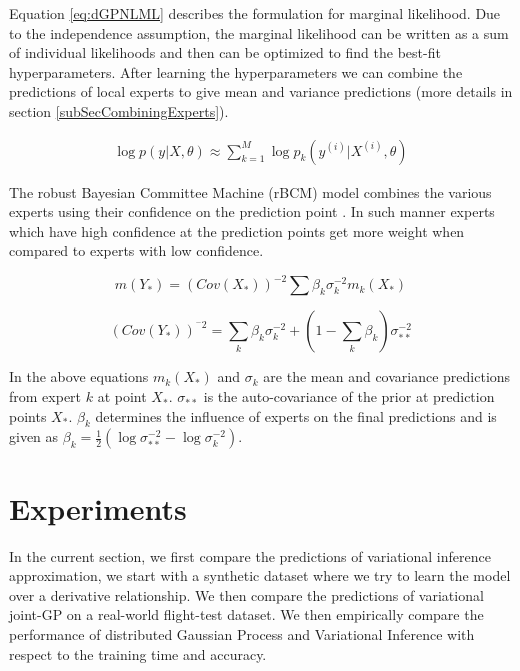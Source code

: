 Equation \ref{eq:dGPNLML} describes the formulation for marginal likelihood. Due to the independence assumption, the marginal likelihood can be written as a sum of individual likelihoods and then can be optimized to find the best-fit hyperparameters. After learning the hyperparameters we can combine the predictions of local experts to give mean and variance predictions (more details in section \ref{subSecCombiningExperts}). 

\begin{align}\label{eq:dGPNLML}
    \log p(y| X, \theta) \approx \sum_{k=1}^{M} \log p_{k}(y^{(i)}| X^{(i)}, \theta)
 \end{align}

The robust Bayesian Committee Machine (rBCM) model combines the various experts using their confidence on the prediction point \cite{deisenroth2015distributed}. In such manner experts which have high confidence at the prediction points get more weight when compared to experts with low confidence. 

\begin{equation}\label{eq:meanDGP}
    m(Y_{*}) = (Cov(X_{*}))^{-2}\sum \beta_{k}\sigma_{k}^{-2}m_{k}(X_{*})
\end{equation}

\begin{equation}
    (Cov(Y_{*}))^{^-2} = \sum_{k} \beta_{k}\sigma_{k}^{-2} + (1- \sum_{k} \beta_{k})\sigma^{-2}_{**}
\end{equation}

In the above equations \(m_{k}(X_{*})\) and \(\sigma_{k}\) are the mean and covariance predictions from expert \(k\) at point \(X_{*}\). \(\sigma_{**}\) is the auto-covariance of the prior at prediction points \(X_{*}\). \(\beta_{k}\) determines the influence of experts on the final predictions \cite{caoF14} and is given as \(\beta_{k} = \frac{1}{2}(\log\sigma_{**}^{-2} - \log\sigma_{k}^{-2})\).  

\section{Experiments}\label{sec:experiments}
In the current section, we first compare the predictions of variational inference approximation, we start with a synthetic dataset where we try to learn the model over a derivative relationship. We then compare the predictions of variational joint-GP on a real-world flight-test dataset. We then empirically compare the performance of distributed Gaussian Process and Variational Inference with respect to the training time and accuracy. 

